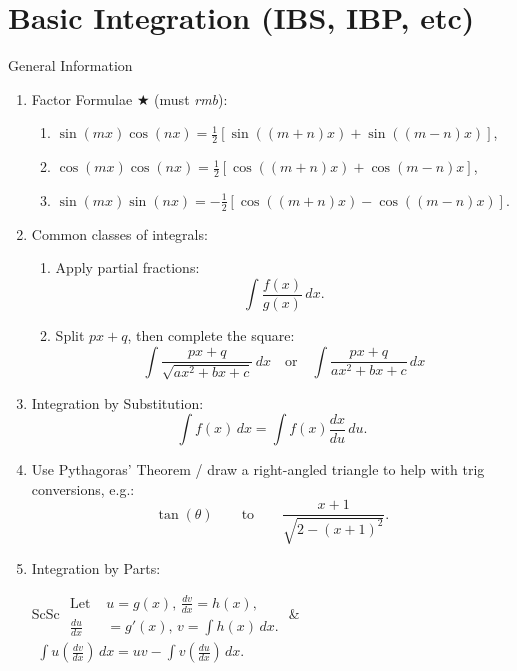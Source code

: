 \documentclass[oneside]{book}
\begin{document}
\section{Basic Integration (IBS, IBP, etc)}
\begin{stbox}{General Information}
  \begin{enumerate}
    \item Factor Formulae \(\bigstar\) (must \emph{rmb}):
    \begin{enumerate}
      \item \(\sin(mx)\cos(nx)=\frac{1}{2}[\sin((m+n)x)+\sin((m-n)x)]\),
      \item \(\cos(mx)\cos(nx)=\frac{1}{2}[\cos((m+n)x)+\cos(m-n)x]\),
      \item \(\sin(mx)\sin(nx)=-\frac{1}{2}[\cos((m+n)x)-\cos((m-n)x)]\).
    \end{enumerate}
    \item Common classes of integrals:
    \begin{enumerate}
      \item Apply partial fractions:
      \[\int\frac{f(x)}{g(x)}\,dx.\]
      \item Split \(px+q\), then complete the square:
      \[\int \frac{px+q}{\sqrt{ax^2+bx+c}}\,dx \quad\text{or}\quad \int \frac{px+q}{ax^2+bx+c}\,dx\] 
    \end{enumerate}
    \item Integration by Substitution: 
    \[\int f(x) \, dx=\int f(x)\frac{dx}{du}\,du.\]
    \item Use Pythagoras' Theorem / draw a right-angled triangle to help with trig conversions, e.g.:
    \[\tan(\theta) \qquad\text{to}\qquad \frac{x+1}{\sqrt{2-(x+1)^2}}.\]
    \item Integration by Parts:
    \begin{center}
      \begin{tabular}{ScSc}
        \(\begin{aligned}
          \text{Let }&u=g(x)\text{, }\frac{dv}{dx}=h(x),\\
          \frac{du}{dx}&=g'(x)\text{, }v=\int h(x)\, dx.
        \end{aligned}\) & \hspace{1cm}\(\begin{aligned}
          \int u\left(\frac{dv}{dx}\right)\,dx=uv-\int v \left(\frac{du}{dx}\right)\,dx.
        \end{aligned}\)
      \end{tabular}
    \end{center}
  \end{enumerate}
\end{stbox}
\newpage
\end{document}
